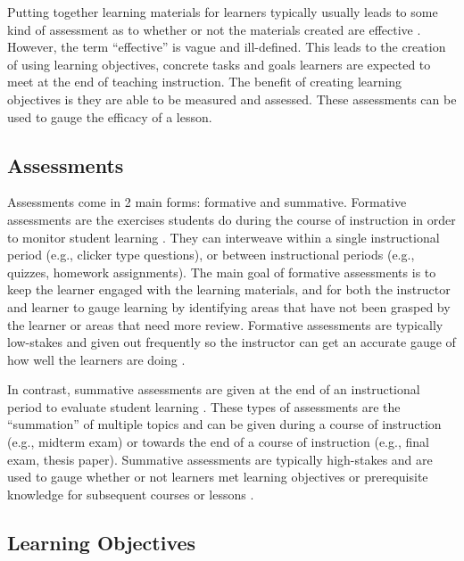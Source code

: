 \documentclass[040-assessment.tex]{subfiles}
\begin{document}
Putting together learning materials for learners typically usually leads to some kind of
assessment as to whether or not the materials created are effective
\cite{ambrose2010learning, wilson2019teaching}.
However, the term ``effective'' is vague and ill-defined.
This leads to the creation of using learning objectives,
concrete tasks and goals learners are expected to meet at the end of teaching instruction.
The benefit of creating learning objectives is they are able to be measured and assessed.
These assessments can be used to gauge the efficacy of a lesson.

\subsection{Assessments}

    Assessments come in 2 main forms: formative and summative.
    Formative assessments are the exercises students do during the course of instruction
    in order to monitor student learning
    \cite{universityFormativeVsSummative, wilson2019teaching}.
    They can interweave within a single instructional period (e.g., clicker type questions),
    or between instructional periods (e.g., quizzes, homework assignments).
    The main goal of formative assessments is to keep the learner engaged with the learning materials,
    and for both the instructor and learner to gauge learning by identifying areas that have not been grasped by the
    learner or areas that need more review.
    Formative assessments are typically low-stakes and given out frequently so the instructor
    can get an accurate gauge of how well the learners are doing
    \cite{universityFormativeVsSummative, wilson2019teaching}.

    In contrast, summative assessments are given at the end of an instructional period
    to evaluate student learning
    \cite{universityFormativeVsSummative, wilson2019teaching}.
    These types of assessments are the ``summation'' of multiple topics and can be given
    during a course of instruction (e.g., midterm exam)
    or towards the end of a course of instruction (e.g., final exam, thesis paper).
    Summative assessments are typically high-stakes and
    are used to gauge whether or not learners met learning objectives or
    prerequisite knowledge for subsequent courses or lessons
    \cite{universityFormativeVsSummative, wilson2019teaching}.

\subsection{Learning Objectives}
\end{document}
